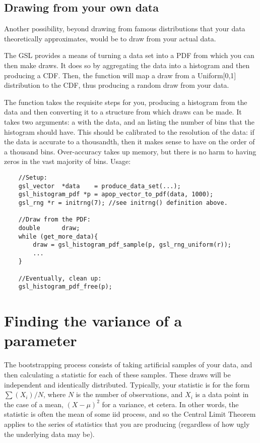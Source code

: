 \subsection{Drawing from your own data} Another possibility, beyond
drawing from famous distributions that your data theoretically
approximates, would be to draw from your actual data. 

The GSL provides a means of turning a data set into a PDF from which you
can then make draws.  It
does so by aggregating the data into a histogram and then producing a CDF.
Then, the  function will
map a draw from a Uniform[0,1] distribution to the CDF, thus producing a
random draw from your data.

The  function takes the requisite steps
for you, producing a histogram from the data and then converting it to
a  structure from which draws can be
made. It takes two arguments: a  with the data, and
an  listing the number of bins that the histogram should
have. This should be calibrated to the resolution of the data: if the
data is accurate to a thousandth, then it makes sense to have on the
order  of a thousand
bins. Over-accuracy takes up memory, but there is no harm to having
zeros in the vast majority of bins. Usage:
\begin{lstlisting}
    //Setup:
    gsl_vector  *data    = produce_data_set(...);
    gsl_histogram_pdf *p = apop_vector_to_pdf(data, 1000);
    gsl_rng *r = initrng(7); //see initrng() definition above.

    //Draw from the PDF:
    double      draw;
    while (get_more_data){
        draw = gsl_histogram_pdf_sample(p, gsl_rng_uniform(r));
        ...
    }

    //Eventually, clean up:
    gsl_histogram_pdf_free(p);
\end{lstlisting}



\section{Finding the variance of a parameter}
The bootstrapping process consists of taking artificial samples of your
data, and then calculating a statistic for each of these samples. These
draws will be independent and identically distributed.  Typically,
your statistic is for the form $\sum (X_i)/ N$, where  $N$ is the number
of observations, and $X_i$ is a data point in the case of a mean,
$(X-\mu)^2$ for a variance, et cetera. In other words, the statistic
is often the mean of some iid process, and so the Central Limit Theorem
applies to the series of statistics that you are producing (regardless
of how ugly the underlying data may be).

